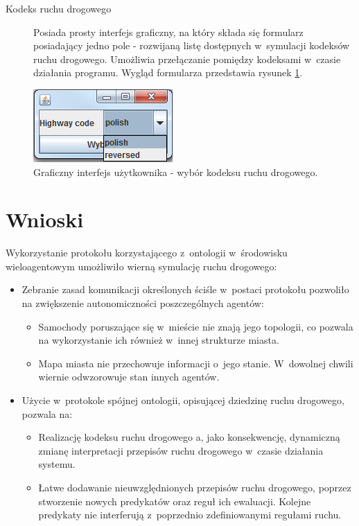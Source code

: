 \documentclass[a4paper,11pt]{article}
\begin{document}
\begin{description}
    \item[Kodeks ruchu drogowego] Posiada prosty interfejs graficzny, na który składa się formularz posiadający jedno pole - rozwijaną listę dostępnych w~symulacji kodeksów ruchu drogowego. Umożliwia przełączanie pomiędzy kodeksami w~czasie działania programu. Wygląd formularza przedstawia rysunek \ref{img:highway_code_selector}.
\end{description}

\begin{figure}[ht!]
    \centering
    \includegraphics{gui_highway_code_selector.png}
    \caption{Graficzny interfejs użytkownika - wybór kodeksu ruchu drogowego.}
    \label{img:highway_code_selector}
\end{figure}

\section{Wnioski}

Wykorzystanie protokołu korzystającego z~ontologii w~środowisku wieloagentowym umożliwiło wierną symulację ruchu drogowego:

\begin{itemize}
    \item Zebranie zasad komunikacji określonych ściśle w~postaci protokołu pozwoliło na zwiększenie autonomiczności poszczególnych agentów:
        \begin{itemize}
            \item Samochody poruszające się w~mieście nie znają jego topologii, co pozwala na wykorzystanie ich również w~innej strukturze miasta.
            \item Mapa miasta nie przechowuje informacji o~jego stanie. W~dowolnej chwili wiernie odwzorowuje stan innych agentów.
        \end{itemize}
    \item Użycie w~protokole spójnej ontologii, opisującej dziedzinę ruchu drogowego, pozwala na:
        \begin{itemize}
            \item Realizację kodeksu ruchu drogowego a, jako konsekwencję, dynamiczną zmianę interpretacji przepisów ruchu drogowego w~czasie działania systemu.
            \item Łatwe dodawanie nieuwzględnionych przepisów ruchu drogowego, poprzez stworzenie nowych predykatów oraz reguł ich ewaluacji. Kolejne predykaty nie interferują z~poprzednio zdefiniowanymi regułami ruchu.
        \end{itemize}
\end{itemize}
\end{document}

